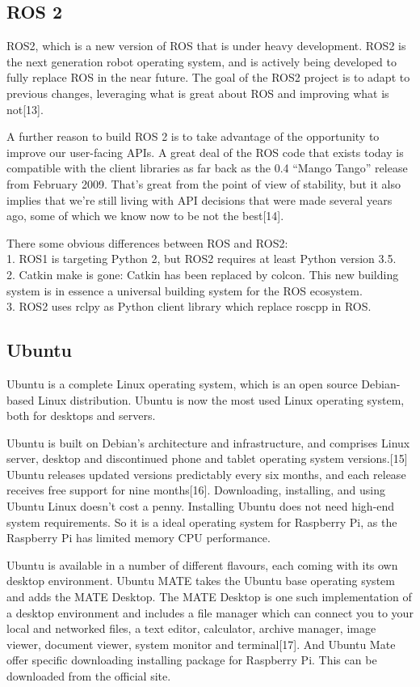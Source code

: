 \documentclass{mproj}
\begin{document}
\subsection{ROS 2}
ROS2, which is a new version of ROS that is under heavy development. ROS2 is the next generation robot operating system, and is actively being developed to fully replace ROS in the near future. The goal of the ROS2 project is to adapt to previous changes, leveraging what is great about ROS and improving what is not[13]. 

A further reason to build ROS 2 is to take advantage of the opportunity to improve our user-facing APIs. A great deal of the ROS code that exists today is compatible with the client libraries as far back as the 0.4 “Mango Tango” release from February 2009. That’s great from the point of view of stability, but it also implies that we’re still living with API decisions that were made several years ago, some of which we know now to be not the best[14].

There some obvious differences between ROS and ROS2: \\
1. ROS1 is targeting Python 2, but ROS2 requires at least Python version 3.5. \\
2. Catkin make is gone: Catkin has been replaced by colcon. This new building system is in essence a universal building system for the ROS ecosystem. \\
3. ROS2 uses rclpy as Python client library which replace roscpp in ROS.

\subsection{Ubuntu}
Ubuntu is a complete Linux operating system, which is an open source Debian-based Linux distribution. Ubuntu is now the most used Linux operating system, both for desktops and servers.

Ubuntu is built on Debian's architecture and infrastructure, and comprises Linux server, desktop and discontinued phone and tablet operating system versions.[15] Ubuntu releases updated versions predictably every six months, and each release receives free support for nine months[16]. Downloading, installing, and using Ubuntu Linux doesn’t cost a penny. Installing Ubuntu does not need high-end system requirements. So it is a ideal operating system for Raspberry Pi, as the Raspberry Pi has limited memory CPU performance. 

Ubuntu is available in a number of different flavours, each coming with its own desktop environment. Ubuntu MATE takes the Ubuntu base operating system and adds the MATE Desktop. The MATE Desktop is one such implementation of a desktop environment and includes a file manager which can connect you to your local and networked files, a text editor, calculator, archive manager, image viewer, document viewer, system monitor and terminal[17]. And Ubuntu Mate offer specific downloading installing package for Raspberry Pi. This can be downloaded from the official site.
\end{document}
